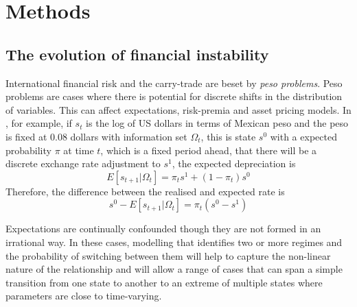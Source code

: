 \documentclass[12pt, a4paper, oneside]{article} %
\begin{document}

\section{Methods}
\subsection{The evolution of financial instability}
International financial risk and the carry-trade are beset by \emph{peso problems}. Peso problems are cases where there is  potential for discrete shifts in the distribution of variables.  This can affect expectations, risk-premia and asset pricing models. In \citet{evans199621}, for example, if $s_t$ is the log of US dollars in terms of Mexican peso and the peso is fixed at 0.08 dollars with information set $\Omega_t$, this is state $s^0$ with a expected probability $\pi$ at time $t$, which is a fixed period ahead, that there will be a discrete exchange rate adjustment to $s^1$, the expected depreciation is 
\begin{equation}
E[s_{t+1}|\Omega_t] = \pi_ts^1 + (1 - \pi_t)s^0
\end{equation}
Therefore, the difference between the realised and expected rate is 
\begin{equation}
s^0 - E[s_{t+1}|\Omega_t] = \pi_t(s^0 - s^1)
\end{equation}


Expectations are continually confounded though they are not formed in an irrational way. In these cases, modelling that identifies two or more regimes and the probability of switching between them will help to capture the non-linear nature of the relationship and will allow a range of cases that can span a simple transition from one state to another to an extreme of multiple states where parameters are close to time-varying.  
\end{document}

